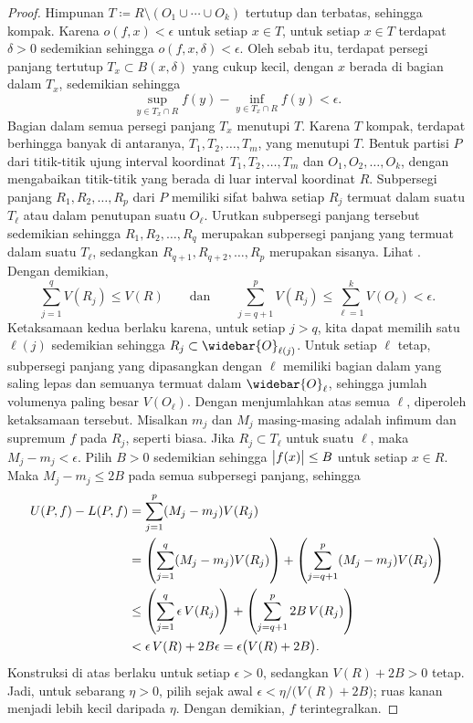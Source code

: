 \begin{proof}
Himpunan $T \coloneqq R \setminus ( O_1 \cup \cdots \cup O_k )$ tertutup dan
terbatas, sehingga kompak. Karena $o(f,x) < \epsilon$ untuk setiap $x \in T$,
untuk setiap $x \in T$ terdapat $\delta > 0$ sedemikian sehingga
$o(f,x,\delta) < \epsilon$. Oleh sebab itu, terdapat persegi panjang tertutup
$T_x \subset B(x,\delta)$ yang cukup kecil, dengan $x$ berada di bagian dalam
$T_x$, sedemikian sehingga
\begin{equation*}
\sup_{y\in T_x \cap R} f(y) - \inf_{y\in T_x \cap R} f(y) < \epsilon.
\end{equation*}
Bagian dalam semua persegi panjang $T_x$ menutupi $T$. Karena $T$ kompak,
terdapat berhingga banyak di antaranya, $T_1,T_2,\ldots,T_m$, yang menutupi
$T$. Bentuk partisi $P$ dari titik-titik ujung interval koordinat
$T_1,T_2,\ldots,T_m$ dan $O_1,O_2,\ldots,O_k$, dengan mengabaikan titik-titik
yang berada di luar interval koordinat $R$. Subpersegi panjang
$R_1,R_2,\ldots,R_p$ dari $P$ memiliki sifat bahwa setiap $R_j$ termuat dalam
suatu $T_\ell$ atau dalam penutupan suatu $O_\ell$. Urutkan subpersegi panjang
tersebut sedemikian sehingga $R_1,R_2,\ldots,R_q$ merupakan subpersegi panjang
yang termuat dalam suatu $T_\ell$, sedangkan $R_{q+1},R_{q+2},\ldots,R_{p}$
merupakan sisanya.
Lihat . Dengan demikian,
\begin{equation*}
\sum_{j=1}^q V(R_j) \leq V(R)
\qquad \text{dan} \qquad
\sum_{j=q+1}^p V(R_j)
\leq
\sum_{\ell=1}^k V(O_\ell)
< \epsilon .
\end{equation*}
Ketaksamaan kedua berlaku karena, untuk setiap $j>q$, kita dapat memilih satu
$\ell(j)$ sedemikian sehingga $R_j \subset \widebar{O}_{\ell(j)}$. Untuk setiap
$\ell$ tetap, subpersegi panjang yang dipasangkan dengan $\ell$ memiliki bagian
dalam yang saling lepas dan semuanya termuat dalam $\widebar{O}_\ell$, sehingga
jumlah volumenya paling besar $V(O_\ell)$. Dengan menjumlahkan atas semua
$\ell$, diperoleh ketaksamaan tersebut.
Misalkan $m_j$ dan $M_j$ masing-masing adalah infimum dan supremum $f$ pada
$R_j$, seperti biasa. Jika $R_j \subset T_\ell$ untuk suatu $\ell$, maka
$M_j-m_j < \epsilon$.
Pilih $B > 0$ sedemikian sehingga
$\bigl\lvert {f(x)} \bigr\rvert \leq B$ untuk setiap $x \in R$. Maka $M_j-m_j \leq 2B$ pada semua
subpersegi panjang, sehingga
\begin{equation*}
\begin{split}
U(P,f)-L(P,f)
& =
\sum_{j=1}^p (M_j-m_j) V(R_j)
\\
& =
\left(
\sum_{j=1}^q (M_j-m_j) V(R_j)
\right)
+
\left(
\sum_{j=q+1}^p (M_j-m_j) V(R_j)
\right)
\\
& \leq
\left(
\sum_{j=1}^q \epsilon\, V(R_j)
\right)
+
\left(
\sum_{j=q+1}^p 2 B\, V(R_j)
\right)
\\
& <
\epsilon\, V(R)
+
2B \epsilon = \epsilon \bigl(V(R)+2B\bigr) .
\end{split}
\avoidbreak
\end{equation*}
Konstruksi di atas berlaku untuk setiap $\epsilon>0$, sedangkan
$V(R)+2B>0$ tetap. Jadi, untuk sebarang $\eta>0$, pilih sejak awal
$\epsilon<\eta/\bigl(V(R)+2B\bigr)$; ruas kanan menjadi lebih kecil daripada
$\eta$. Dengan demikian, $f$ terintegralkan.


\end{proof}
